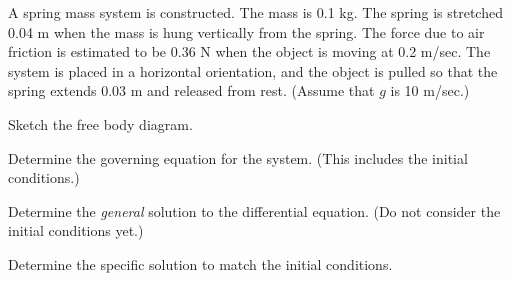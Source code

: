 


  \begin{problem}

  \item A spring mass system is constructed. The mass is 0.1 kg. The
    spring is stretched 0.04 m when the mass is hung vertically from
    the spring. The force due to air friction is estimated to be 0.36
    N when the object is moving at 0.2 m/sec. The system is placed in
    a horizontal orientation, and the object is pulled so that the
    spring extends 0.03 m and released from rest. (Assume that $g$ is
    10 m/sec.)

    \begin{subproblem}
      \item Sketch the free body diagram.
        \vspace{4em}

      \item Determine the governing equation for the system. (This
        includes the initial conditions.)
        \vfill


      \item Determine the \textit{general} solution to the differential
        equation. (Do not consider the initial conditions yet.)
        \vfill

        \clearpage

      \item Determine the specific solution to match the initial conditions.

        \vfill

    \end{subproblem}



  \end{problem}


